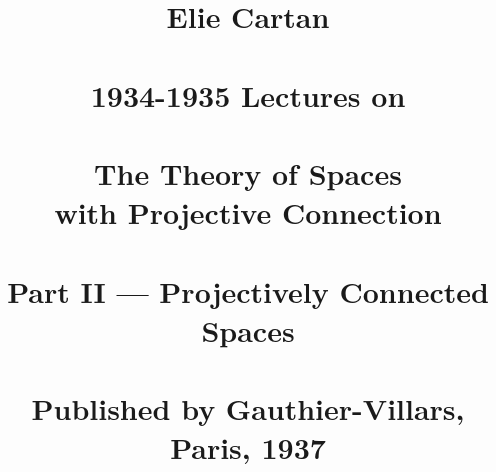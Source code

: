 \documentclass{EngC}
\theoremstyle{plain}%
\theoremstyle{definition}
\theoremstyle{remark}
\theoremstyle{remark}
\theoremstyle{example}
\begin{document}
\title[ \ \\ \ \\ \ \\Translated by\\ \ \\
F A M Frescura \\Centre for Theoretical Physics
\\University of the Witwatersrand]
{Elie Cartan \\ \ \\ {\Large 1934-1935 Lectures on} \\ \ \\ The Theory of Spaces\\[.4cm] with Projective Connection\\ \ \\Part II --- Projectively Connected Spaces \\ \ \\ \Large Published by Gauthier-Villars, Paris, 1937}







\maketitle
\frontmatter%

%
%
%

\tableofcontents

%


\mainmatter%














                      
\end{document}
